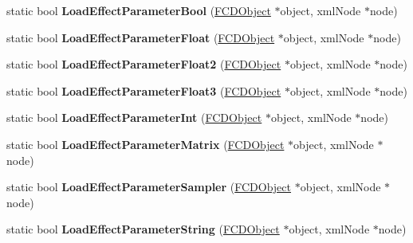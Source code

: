 \begin{DoxyCompactItemize}
\item 
\hypertarget{classFArchiveXML_a29c3f291898ca121df019ba96562c972}{
static bool {\bfseries LoadEffectParameterBool} (\hyperlink{classFCDObject}{FCDObject} $\ast$object, xmlNode $\ast$node)}
\label{classFArchiveXML_a29c3f291898ca121df019ba96562c972}

\item 
\hypertarget{classFArchiveXML_a96bc1c1dbd9288ab5d0ab53bf332744e}{
static bool {\bfseries LoadEffectParameterFloat} (\hyperlink{classFCDObject}{FCDObject} $\ast$object, xmlNode $\ast$node)}
\label{classFArchiveXML_a96bc1c1dbd9288ab5d0ab53bf332744e}

\item 
\hypertarget{classFArchiveXML_a2823a5559af325bd967dd88c6d1951d3}{
static bool {\bfseries LoadEffectParameterFloat2} (\hyperlink{classFCDObject}{FCDObject} $\ast$object, xmlNode $\ast$node)}
\label{classFArchiveXML_a2823a5559af325bd967dd88c6d1951d3}

\item 
\hypertarget{classFArchiveXML_a305287ced718d4dc17e5601ffbb1fcec}{
static bool {\bfseries LoadEffectParameterFloat3} (\hyperlink{classFCDObject}{FCDObject} $\ast$object, xmlNode $\ast$node)}
\label{classFArchiveXML_a305287ced718d4dc17e5601ffbb1fcec}

\item 
\hypertarget{classFArchiveXML_af963cd0c755b4111dfcbf7a04a592e6c}{
static bool {\bfseries LoadEffectParameterInt} (\hyperlink{classFCDObject}{FCDObject} $\ast$object, xmlNode $\ast$node)}
\label{classFArchiveXML_af963cd0c755b4111dfcbf7a04a592e6c}

\item 
\hypertarget{classFArchiveXML_a382fcc2676fa9c3d221fb360af796103}{
static bool {\bfseries LoadEffectParameterMatrix} (\hyperlink{classFCDObject}{FCDObject} $\ast$object, xmlNode $\ast$node)}
\label{classFArchiveXML_a382fcc2676fa9c3d221fb360af796103}

\item 
\hypertarget{classFArchiveXML_ac117edb1dbd423e36e2c16f0a0436e49}{
static bool {\bfseries LoadEffectParameterSampler} (\hyperlink{classFCDObject}{FCDObject} $\ast$object, xmlNode $\ast$node)}
\label{classFArchiveXML_ac117edb1dbd423e36e2c16f0a0436e49}

\item 
\hypertarget{classFArchiveXML_a09d5269f821f5200d9d62c9393a66975}{
static bool {\bfseries LoadEffectParameterString} (\hyperlink{classFCDObject}{FCDObject} $\ast$object, xmlNode $\ast$node)}
\label{classFArchiveXML_a09d5269f821f5200d9d62c9393a66975}


\end{DoxyCompactItemize}

